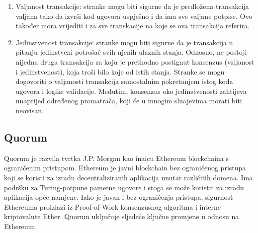 \documentclass[times, utf8, diplomski]{fer}
\begin{document}
\begin{enumerate}

\item Valjanost transakcije: stranke mogu biti sigurne da je predložena transakcija valjana tako da izvrši kod ugovora uspješno i da ima sve valjane potpise. Ovo također mora vrijediti i za sve transkacije na koje se ova transakcija referira.

\item Jedinstvenost transakcije: stranke mogu biti sigurne da je transakcija u pitanju jedinstveni potrošač svih njenih ulaznih stanja. Odnosno, ne postoji nijedna druga transakcija za koju je prethodno postignut konsenzus (valjanost i jedinstvenost), koja troši bilo koje od istih stanja. Stranke se mogu dogovoriti o valjanosti transakcija samostalnim pokretanjem istog koda ugovora i logike validacije. Međutim, konsenzus oko jedinstvenosti zahtijeva unaprijed određenog promatrača,  koji će u mnogim sluajevima morati biti neovisan.

\end{enumerate}

\subsection{Quorum}

Quorum je razvila tvrtka J.P. Morgan kao inaicu Ethereum blockchaina s ograničenim pristupom. Ethereum je javni blockchain bez ograničenog pristupa koji se koristi za izradu decentraliziranih aplikacija unutar različitih domena. Ima podršku za Turing-potpune pametne ugovore i stoga se može koristit za izradu aplikacija opće namjene.  Iako je javan i bez ograničenja pristupa, sigurnost Ethereuma proizlazi iz Proof-of-Work konsenzusnog algoritma i interne kriptovalute Ether. Quorum uključuje sljedeće ključne promjene u odnosu na Ethereum:
\end{document}
